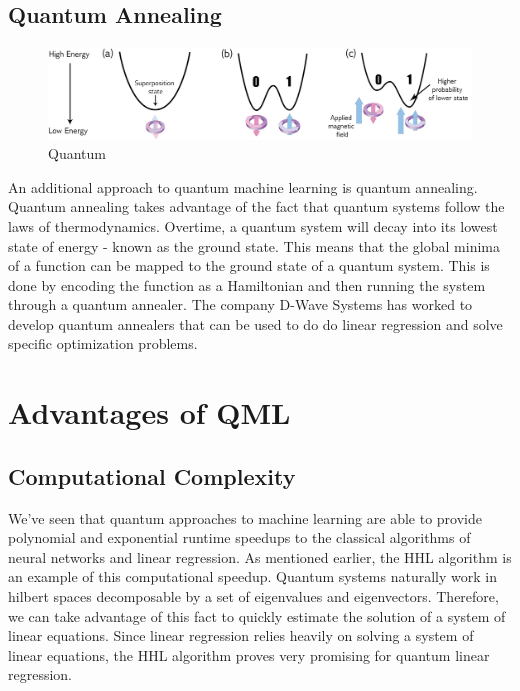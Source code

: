 \documentclass[12pt]{article}
\begin{document}
\subsection*{Quantum Annealing}
\begin{figure}[h]
\centering
\includegraphics[width=1\textwidth]{QuantumAnnealing.png}
\caption{Quantum }
\end{figure}
An additional approach to quantum machine learning is quantum annealing. Quantum annealing takes advantage of the fact that quantum systems follow the laws of thermodynamics. Overtime, a quantum system will decay into its lowest state of energy - known as the ground state. This means that the global minima of a function can be mapped to the ground state of a quantum system. This is done by encoding the function as a Hamiltonian and then running the system through a quantum annealer. The company D-Wave Systems has worked to develop quantum annealers that can be used to do do linear regression and solve specific optimization problems.\cite{adachi_henderson_2021}





\section*{Advantages of QML}
\subsection*{Computational Complexity}
We've seen that quantum approaches to machine learning are able to provide polynomial and exponential runtime speedups to the classical algorithms of neural networks and linear regression. As mentioned earlier, the HHL algorithm is an example of this computational speedup. Quantum systems naturally work in hilbert spaces decomposable by a set of eigenvalues and eigenvectors. Therefore, we can take advantage of this fact to quickly estimate the solution of a system of linear equations. Since linear regression relies heavily on solving a system of linear equations, the HHL algorithm proves very promising for quantum linear regression.
\end{document}
